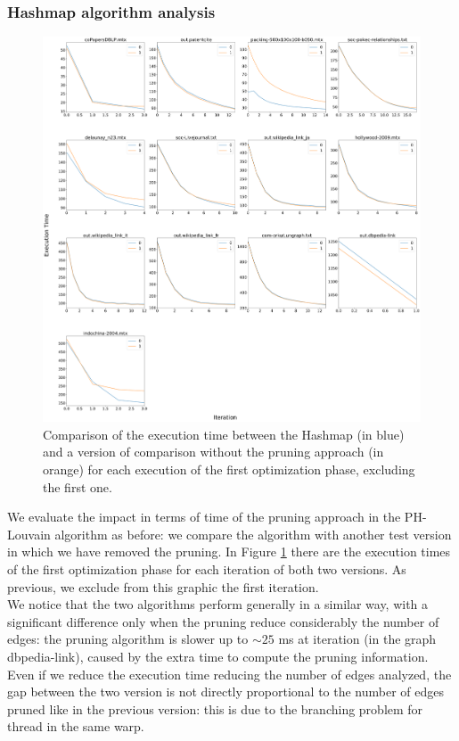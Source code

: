 \subsubsection{Hashmap algorithm analysis}\label{hashmap-analysis}
\begin{figure}[h]
	\centering
	\includegraphics[width=1\linewidth]{0-resources/hash-prune-vs-no-prune}
	\caption{Comparison of the execution time between the Hashmap (in blue) and a version of comparison without the pruning approach (in orange) for each execution of the first optimization phase, excluding the first one. }
	\label{fig:hash-prune-vs-no-prune}
\end{figure}
\noindent We evaluate the impact in terms of time of the pruning approach in the PH-Louvain algorithm as before: we compare the algorithm with another test version in which we have removed the pruning. In Figure \ref{fig:hash-prune-vs-no-prune} there are the execution times of the first optimization phase for each iteration of both two versions. As previous, we exclude from this graphic the first iteration. \\
We notice that the two algorithms perform generally in a similar way, with a significant difference only when the pruning reduce considerably the number of edges: the pruning algorithm is slower up to $\sim25$ ms at iteration (in the graph dbpedia-link), caused by the extra time to compute the pruning information. Even if we reduce the execution time reducing the number of edges analyzed, the gap between the two version is not directly proportional to the number of edges pruned like in the previous version: this is due to the branching problem for thread in the same warp. \\

